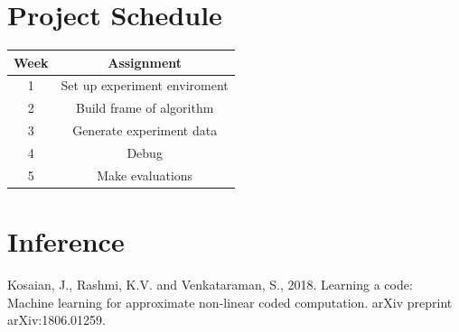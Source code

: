 \documentclass{article}
\begin{document}
        
        \section{Project Schedule}
            \begin{tabular}{cc}
                \hline
                Week & Assignment \\ \hline
                1& Set up experiment enviroment \\
                2& Build frame of algorithm \\
                3& Generate experiment data \\
                4& Debug \\
                5& Make evaluations \\
                \hline
            \end{tabular}

        \section{Inference}
        Kosaian, J., Rashmi, K.V. and Venkataraman, S., 2018. Learning a code: Machine learning for approximate non-linear coded computation. arXiv preprint arXiv:1806.01259.
            
        
            
\end{document}
